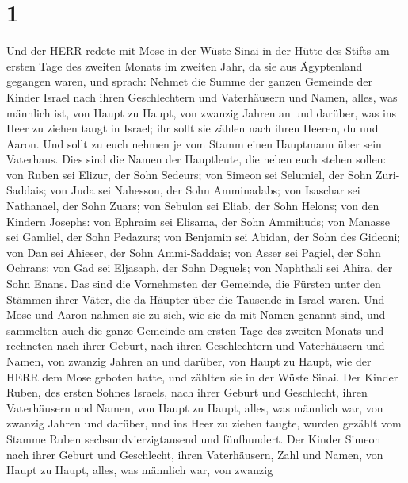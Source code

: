 \hypertarget{section}{%
\section{1}\label{section}}

 Und der HERR redete mit Mose in der Wüste Sinai in der
Hütte des Stifts am ersten Tage des zweiten Monats im zweiten Jahr, da
sie aus Ägyptenland gegangen waren, und sprach:  Nehmet die
Summe der ganzen Gemeinde der Kinder Israel nach ihren Geschlechtern und
Vaterhäusern und Namen, alles, was männlich ist, von Haupt zu Haupt,
 von zwanzig Jahren an und darüber, was ins Heer zu ziehen
taugt in Israel; ihr sollt sie zählen nach ihren Heeren, du und Aaron.
 Und sollt zu euch nehmen je vom Stamm einen Hauptmann über
sein Vaterhaus.  Dies sind die Namen der Hauptleute, die
neben euch stehen sollen: von Ruben sei Elizur, der Sohn Sedeurs;
 von Simeon sei Selumiel, der Sohn Zuri-Saddais;
 von Juda sei Nahesson, der Sohn Amminadabs; 
von Isaschar sei Nathanael, der Sohn Zuars;  von Sebulon sei
Eliab, der Sohn Helons;  von den Kindern Josephs: von
Ephraim sei Elisama, der Sohn Ammihuds; von Manasse sei Gamliel, der
Sohn Pedazurs;  von Benjamin sei Abidan, der Sohn des
Gideoni;  von Dan sei Ahieser, der Sohn Ammi-Saddais;
 von Asser sei Pagiel, der Sohn Ochrans;  von
Gad sei Eljasaph, der Sohn Deguels;  von Naphthali sei
Ahira, der Sohn Enans.  Das sind die Vornehmsten der
Gemeinde, die Fürsten unter den Stämmen ihrer Väter, die da Häupter über
die Tausende in Israel waren.  Und Mose und Aaron nahmen
sie zu sich, wie sie da mit Namen genannt sind,  und
sammelten auch die ganze Gemeinde am ersten Tage des zweiten Monats und
rechneten nach ihrer Geburt, nach ihren Geschlechtern und Vaterhäusern
und Namen, von zwanzig Jahren an und darüber, von Haupt zu Haupt,
 wie der HERR dem Mose geboten hatte, und zählten sie in
der Wüste Sinai.  Der Kinder Ruben, des ersten Sohnes
Israels, nach ihrer Geburt und Geschlecht, ihren Vaterhäusern und Namen,
von Haupt zu Haupt, alles, was männlich war, von zwanzig Jahren und
darüber, und ins Heer zu ziehen taugte,  wurden gezählt vom
Stamme Ruben sechsundvierzigtausend und fünfhundert.  Der
Kinder Simeon nach ihrer Geburt und Geschlecht, ihren Vaterhäusern, Zahl
und Namen, von Haupt zu Haupt, alles, was männlich war, von zwanzig
